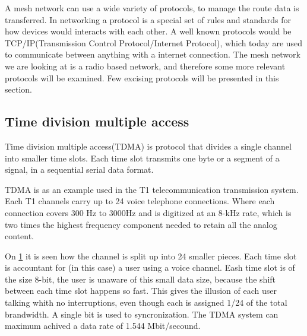 A mesh network can use a wide variety of protocols, to manage the route data is transferred.
In networking a protocol is a special set of rules and standards for how devices would interacts with each other.
A well known protocols would be TCP/IP(Transmission Control Protocol/Internet Protocol), which today are used to communicate between anything with a internet connection.
The mesh network we are looking at is a radio based network, and therefore some more relevant protocols will be examined. 
Few excising protocols will be presented in this section.

\subsection{Time division multiple access}
Time division multiple access(TDMA) is protocol that divides a single channel into smaller time slots. Each time slot transmits one byte or a segment of a signal, in a sequential serial data format.

TDMA is as an example used in the T1 telecommunication transmission system.
Each T1 channels carry up to 24 voice telephone connections.
Where each connection covers 300 Hz to 3000Hz and is digitized at an 8-kHz rate, which is two times the highest frequency component needed to retain all the analog content.
\begin{figure}[!h]\label{TDMAfigure}
	\centering
\end{figure}

On \ref{TDMAfigure} it is seen how the channel is split up into 24 smaller pieces.
Each time slot is accountant for (in this case) a user using a voice channel.
Eash time slot is of the size 8-bit, the user is unaware of this small data size, because the shift between each time slot happens so fast.
This gives the illusion of each user talking whith no interruptions, even though each is assigned 1/24 of the total brandwidth.
A single bit is used to syncronization.
The TDMA system can maximum achived a data rate of 1.544 Mbit/secound.

